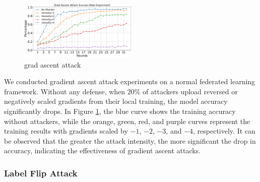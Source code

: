 \documentclass[conference]{IEEEtran}
\def\figGradAscentAttack{0.5\textwidth}
\begin{document}
\begin{figure}[htbp]
    \centerline{\includegraphics[width=\figGradAscentAttack]{pics/001-gradAttack-attackRate.pdf}}
    \caption{grad ascent attack}
    \label{fig:gradAscent}
\end{figure}

We conducted gradient ascent attack experiments on a normal federated learning framework. Without any defense, when 20\% of attackers upload reversed or negatively scaled gradients from their local training, the model accuracy significantly drops. In Figure \hyperref[fig:gradAscent]{\ref{fig:gradAscent}}, the blue curve shows the training accuracy without attackers, while the orange, green, red, and purple curves represent the training results with gradients scaled by $-1$, $-2$, $-3$, and $-4$, respectively. It can be observed that the greater the attack intensity, the more significant the drop in accuracy, indicating the effectiveness of gradient ascent attacks.


\subsubsection{\textbf{Label Flip Attack}}
\label{exp:attack:label}
\end{document}
